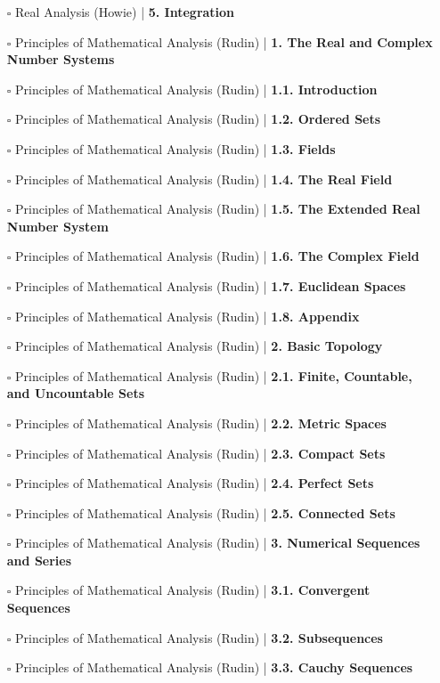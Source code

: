 \documentclass[a4, landscape, 12pt]{article}
\newcommand{\checkbox}{$\square$}%
\begin{document}
\begin{itemize}
{}
\item [\checkbox] Real Analysis (Howie)  | \textbf{5. Integration
}
\item [\checkbox] Principles of Mathematical Analysis (Rudin)  | \textbf{1. The Real and Complex Number Systems
}
\item [\checkbox] Principles of Mathematical Analysis (Rudin)  | \textbf{1.1. Introduction
}
\item [\checkbox] Principles of Mathematical Analysis (Rudin)  | \textbf{1.2. Ordered Sets
}
\item [\checkbox] Principles of Mathematical Analysis (Rudin)  | \textbf{1.3. Fields
}
\item [\checkbox] Principles of Mathematical Analysis (Rudin)  | \textbf{1.4. The Real Field
}
\item [\checkbox] Principles of Mathematical Analysis (Rudin)  | \textbf{1.5. The Extended Real Number System
}
\item [\checkbox] Principles of Mathematical Analysis (Rudin)  | \textbf{1.6. The Complex Field
}
\item [\checkbox] Principles of Mathematical Analysis (Rudin)  | \textbf{1.7. Euclidean Spaces
}
\item [\checkbox] Principles of Mathematical Analysis (Rudin)  | \textbf{1.8. Appendix
}
\item [\checkbox] Principles of Mathematical Analysis (Rudin)  | \textbf{2. Basic Topology
}
\item [\checkbox] Principles of Mathematical Analysis (Rudin)  | \textbf{2.1. Finite, Countable, and Uncountable Sets
}
\item [\checkbox] Principles of Mathematical Analysis (Rudin)  | \textbf{2.2. Metric Spaces
}
\item [\checkbox] Principles of Mathematical Analysis (Rudin)  | \textbf{2.3. Compact Sets
}
\item [\checkbox] Principles of Mathematical Analysis (Rudin)  | \textbf{2.4. Perfect Sets
}
\item [\checkbox] Principles of Mathematical Analysis (Rudin)  | \textbf{2.5. Connected Sets
}
\item [\checkbox] Principles of Mathematical Analysis (Rudin)  | \textbf{3. Numerical Sequences and Series
}
\item [\checkbox] Principles of Mathematical Analysis (Rudin)  | \textbf{3.1. Convergent Sequences
}
\item [\checkbox] Principles of Mathematical Analysis (Rudin)  | \textbf{3.2. Subsequences
}
\item [\checkbox] Principles of Mathematical Analysis (Rudin)  | \textbf{3.3. Cauchy Sequences
}
\end{itemize}
\end{document}
